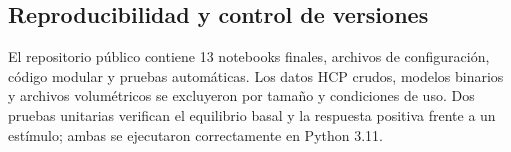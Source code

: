 \subsection{Reproducibilidad y control de versiones}

El repositorio público contiene 13 notebooks finales, archivos de configuración, código modular y pruebas automáticas. Los datos HCP crudos, modelos binarios y archivos volumétricos se excluyeron por tamaño y condiciones de uso. Dos pruebas unitarias verifican el equilibrio basal y la respuesta positiva frente a un estímulo; ambas se ejecutaron correctamente en Python 3.11.
